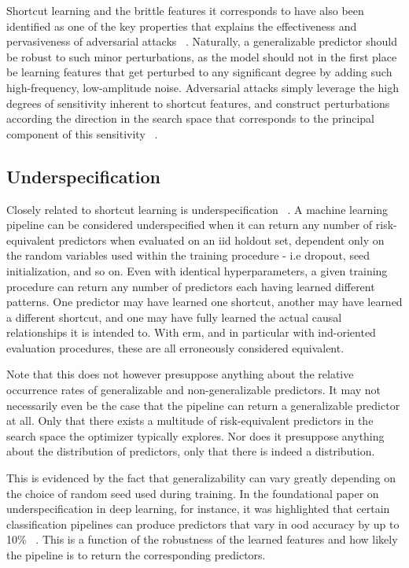 	Shortcut learning and the brittle features it corresponds to have also been identified as one of the key properties that explains the effectiveness and pervasiveness of adversarial attacks ~\cite{adversarial_bugs_features}. Naturally, a generalizable predictor should be robust to such minor perturbations, as the model should not in the first place be learning features that get perturbed to any significant degree by adding such high-frequency, low-amplitude noise. Adversarial attacks simply leverage the high degrees of sensitivity inherent to shortcut features, and construct perturbations according the direction in the search space that corresponds to the principal component of this sensitivity ~\cite{sensitivity}. 

	\subsection{Underspecification}
	Closely related to shortcut learning is underspecification ~\cite{damour2020underspecification}. A machine learning pipeline can be considered underspecified when it can return any number of risk-equivalent predictors when evaluated on an \gls{iid} holdout set, dependent only on the random variables used within the training procedure - i.e dropout, seed initialization, and so on. Even with identical hyperparameters, a given training procedure can return any number of predictors each having learned different patterns. One predictor may have learned one shortcut, another may have learned a different shortcut, and one may have fully learned the actual causal relationships it is intended to. With \gls{erm}, and in particular with \gls{ind}-oriented evaluation procedures, these are all erroneously considered equivalent. 

	Note that this does not however presuppose anything about the relative occurrence rates of generalizable and non-generalizable predictors. It may not necessarily even be the case that the pipeline can return a generalizable predictor at all. Only that there exists a multitude of risk-equivalent predictors in the search space the optimizer typically explores. Nor does it presuppose anything about the distribution of predictors, only that there is indeed a distribution. 

	This is evidenced by the fact that generalizability can vary greatly depending on the choice of random seed used during training. In the foundational paper on underspecification in deep learning, for instance, it was highlighted that certain classification pipelines can produce predictors that vary in ood accuracy by up to 10\% ~\cite{damour2020underspecification}. This is a function of the robustness of the learned features and how likely the pipeline is to return the corresponding predictors. 
	
